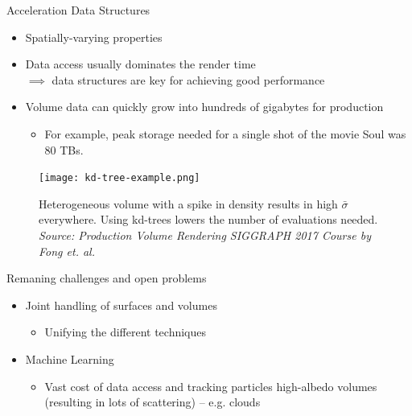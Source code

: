 \documentclass[
  english,            %
  aspectratio=169,    %
]{tumbeamer}
\begin{document}
\begin{frame}{Acceleration Data Structures}
  \begin{itemize}
    \item Spatially-varying properties
    \item Data access usually dominates the render time \\
    $\implies$ data structures are key for achieving good performance
    \item Volume data can quickly grow into hundreds of gigabytes for production
        \begin{itemize}
            \item For example, peak storage needed for a single shot of the
                movie Soul was 80 TBs.
        \end{itemize}
  \end{itemize}
  \begin{figure}
      \centering
      \texttt{[image: kd-tree-example.png]}
      \label{fig:kd-tree-example}
      \caption{Heterogeneous volume with a spike in density results in high
      $\bar\sigma$ everywhere. Using kd-trees lowers the number of evaluations
      needed. \textit{Source: Production Volume Rendering SIGGRAPH 2017 Course by
  Fong et. al.}}
\end{figure}
\end{frame}

\begin{frame}{Remaning challenges and open problems}
    \begin{itemize}
        \item Joint handling of surfaces and volumes
            \begin{itemize}
                \item Unifying the different techniques
            \end{itemize}
        \item Machine Learning
            \begin{itemize}
                \item Vast cost of data access and tracking particles
                    high-albedo volumes (resulting in lots of scattering) --
                    e.g. clouds
            \end{itemize}
    \end{itemize}
\end{frame}
\end{document}
